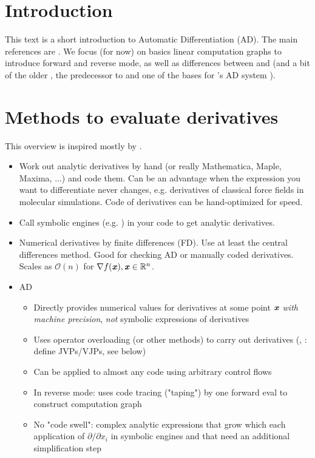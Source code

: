 \documentclass[11pt]{scrartcl}
\begin{document}
\tableofcontents
\newpage

\section{Introduction}

This text is a short introduction to Automatic Differentiation (AD). The main
references are \cite{baydin_2018, johnson_2017, jax_autodiff_cookbook}. We
focus (for now) on basics linear computation graphs to introduce forward and
reverse mode, as well as differences between \jax and \pytorch (and a bit of
the older \autograd, the predecessor to \jax and one of the bases for
\pytorch's AD system \cite{paszke_2017}).

\section{Methods to evaluate derivatives}

This overview is inspired mostly by \cite{baydin_2018}.

\begin{itemize}
    \item Work out analytic derivatives by hand (or really Mathematica, Maple, Maxima, ...)
        and code them. Can be an advantage when the expression you want to
        differentiate never changes, e.g. derivatives of classical force
        fields in molecular simulations. Code of derivatives can be
        hand-optimized for speed.
    \item Call symbolic engines (e.g. ) in your code to get
        analytic derivatives.
    \item Numerical derivatives by finite differences (FD). Use at least
        the central differences method. Good for checking AD or manually coded
        derivatives. Scales as $\mathcal O(n)$ for $\nabla f(\bm{\mathit{x}}), \bm{\mathit{x}}\in\mathbb R^n$.
    \item AD
        \begin{itemize}
            \item Directly provides numerical values for derivatives at some point
                $\bm{\mathit{x}}$ \emph{with machine precision}, \emph{not} symbolic expressions of
                derivatives
            \item Uses operator overloading (or other methods) to carry out
                derivatives (\jax, \pytorch: define JVPs/VJPs, see below)
            \item Can be applied to almost any code using arbitrary control flows
            \item In reverse mode: uses code tracing ("taping") by one forward eval
                to construct computation graph
            \item No "code swell": complex analytic expressions that grow which each
                application of $\partial/\partial x_i$ in symbolic engines and that
                need an additional simplification step
        \end{itemize}
\end{itemize}
\end{document}
